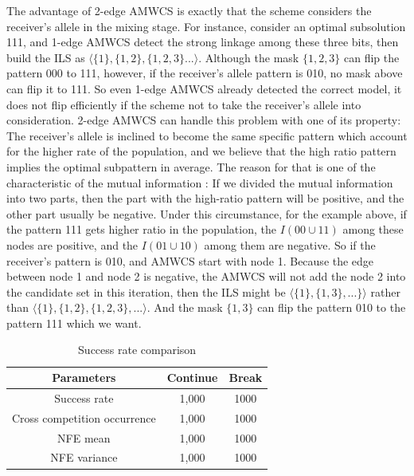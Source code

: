 \documentclass{sig-alternate-05-2015}
\begin{document}
The advantage of 2-edge AMWCS is exactly that the scheme considers the receiver{\rq}s allele in the mixing stage. For instance, consider an optimal subsolution 111, and 1-edge AMWCS detect the  strong  linkage  among  these  three bits, then build the ILS as  $\langle \{1\}, \{1, 2\}, \{1, 2, 3\}... \rangle$. Although the mask $\{1, 2, 3\}$ can flip the pattern 000 to 111, however, if the receiver{\rq}s allele pattern is 010, no mask above can flip it to 111. So even 1-edge AMWCS already detected the correct model, it does not  flip efficiently if the scheme not to take the receiver{\rq}s allele into consideration. 2-edge AMWCS can handle this problem with one of its property: The receiver{\rq}s allele is inclined to become the same specific pattern which account for the higher rate of the population, and we believe that the high ratio pattern implies the optimal subpattern in average. The reason for that is one of the characteristic of the mutual information :  If we divided the mutual information into two parts, then the part with the high-ratio pattern will be positive, and the other part usually be negative. Under this circumstance, for the example above, if the pattern 111 gets higher ratio in the population, the $I(00\cup11)$ among these nodes are positive, and the $I(01\cup10)$ among them are negative. So if the receiver{\rq}s pattern is 010, and AMWCS start with node 1. Because the edge between node 1 and node 2 is negative, the AMWCS will not add the node 2 into the candidate set in this iteration, then the ILS might be $\langle\{1\}, \{1, 3\}, ...\}\rangle$ rather than $\langle\{1\}, \{1, 2\}, \{1, 2, 3\}, ...\rangle$. And the mask $\{1, 3\}$ can flip the pattern 010 to the pattern 111 which we want.    


\begin{table}[ht]
\centering
\begin{tabular}{ |c|c|c| } \hline
Parameters & Continue & Break \\ \hline
Success rate 					& 1,000& 1000\\ \hline
Cross competition occurrence	& 1,000& 1000\\ \hline
NFE mean				 		& 1,000& 1000\\ \hline
NFE variance					& 1,000& 1000\\ \hline
\end{tabular}
\caption{Success rate comparison}
\end{table}
\end{document}
